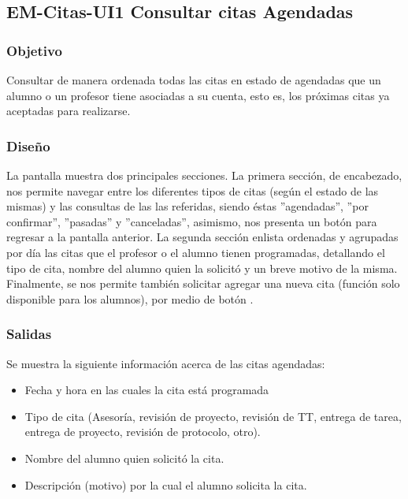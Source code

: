 

\pagebreak
\subsection{EM-Citas-UI1 Consultar citas Agendadas}

\subsubsection{Objetivo}
	\noindent
	Consultar de manera ordenada todas las citas en estado de agendadas que un alumno o un profesor tiene asociadas a su cuenta, esto es, los próximas citas ya aceptadas para realizarse.

\subsubsection{Diseño}
	\noindent
	La pantalla muestra dos principales secciones. La primera sección, de encabezado, nos permite navegar entre los diferentes tipos de citas (según el estado de las mismas) y las consultas de las las referidas, siendo éstas ''agendadas'', ''por confirmar'', ''pasadas'' y ''canceladas'', asimismo, nos presenta un botón para regresar a la pantalla anterior.
	\newline
	La segunda sección enlista ordenadas y agrupadas por día las citas que el profesor o el alumno tienen programadas, detallando el tipo de cita, nombre del alumno quien la solicitó y un breve motivo de la misma. 
	\newline
	Finalmente, se nos permite también solicitar agregar una nueva cita (función solo disponible para los alumnos), por medio de botón \IUbutton{ + }.

\pagebreak
{}

\subsubsection{Salidas}
	\noindent
	Se muestra la siguiente información acerca de las citas agendadas:
		\begin{itemize}
			\item Fecha y hora en las cuales la cita está programada
			\item Tipo de cita (Asesoría, revisión de proyecto, revisión de TT, entrega de tarea, entrega de proyecto, revisión de protocolo, otro).
			\item Nombre del alumno quien solicitó la cita.
			\item Descripción (motivo) por la cual el alumno solicita la cita.
		\end{itemize}

